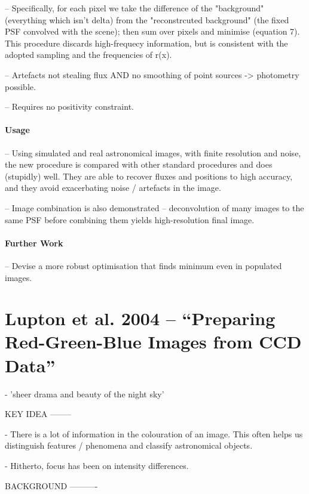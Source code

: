 \documentclass[letterpaper, 11pt]{article}
\begin{document}
-- Specifically, for each pixel we take the difference of the "background" (everything which isn't delta) from the "reconstrcuted background" 
(the fixed PSF convolved with the scene); then sum over pixels and minimise (equation 7). This procedure discards high-frequecy information, 
but is consistent with the adopted sampling and the frequencies of r(x).

-- Artefacts not stealing flux AND no smoothing of point sources -> 
photometry possible.

-- Requires no positivity constraint.


\paragraph{Usage}

-- Using simulated and real astronomical images, with finite resolution and noise, the new procedure is compared with other standard 
procedures and does (stupidly) well. They are able to recover fluxes and positions to high accuracy, and they avoid exacerbating noise / 
artefacts in the image.

-- Image combination is also demonstrated -- deconvolution of many images to the same PSF before combining them yields 
high-resolution final image.


\paragraph{Further Work}

-- Devise a more robust optimisation that finds minimum even in populated images.


\section{Lupton et al. 2004 -- ``Preparing Red-Green-Blue Images from CCD Data''}
\label{sec:Lup++04notes}

- 'sheer drama and beauty of the night sky'

KEY IDEA
--------

- There is a lot of information in the colouration of an image. This often helps us distinguish features / phenomena and classify astronomical objects.

- Hitherto, focus has been on intensity differences.


BACKGROUND	
----------
\end{document}
